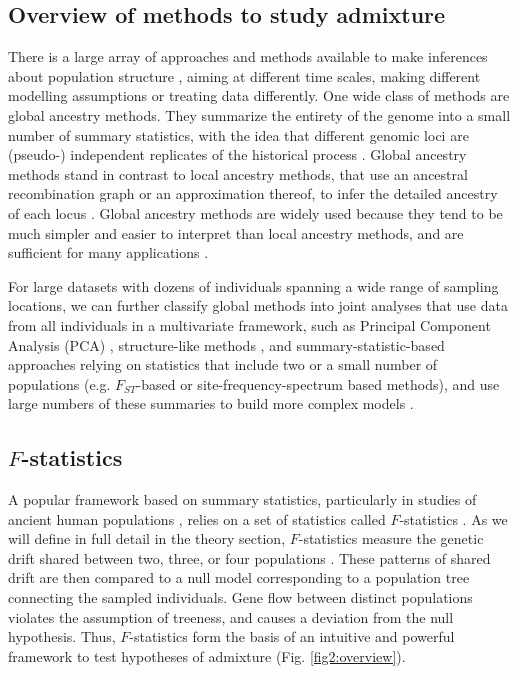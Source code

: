 \documentclass[12pt]{article}
\begin{document}
\subsection{Overview of methods to study admixture}
There is a large array of approaches and methods available to make inferences about population structure \citep[reviewed by][]{schraiber_methods_2015}, aiming at different time scales, making different modelling assumptions or treating data differently. 
One wide class of methods are global ancestry methods. They summarize the entirety of the genome into a small number of summary statistics, with the idea that different genomic loci are (pseudo-) independent replicates of the historical process \citep{pritchard_inference_2000, gopalan_scaling_2016, patterson_ancient_2012,alexander_fast_2009, tang_estimation_2005}. Global ancestry methods stand in contrast to local ancestry methods, that use an ancestral recombination graph or an approximation thereof, to infer the detailed ancestry of each locus  \citep{lawson_inference_2012, hellenthal_genetic_2014, speidel_method_2019, kelleher_inferring_2019}. Global ancestry methods are widely used because they tend to be much simpler and easier to interpret than local ancestry methods, and are sufficient for many applications \citep{pritchard_inference_2000, patterson_population_2006}.

For large datasets with dozens of individuals spanning a wide range of sampling locations, we can further classify global methods into joint analyses that use data from all individuals in a multivariate framework, such as Principal Component Analysis (PCA) \citep{cavalli-sforza_analysis_1975, patterson_population_2006, novembre_genes_2008}, structure-like methods \citep{pritchard_inference_2000, alexander_fast_2009}, and summary-statistic-based approaches relying on statistics that include two or a small number of populations (e.g. $F_{ST}$-based or site-frequency-spectrum based methods), and use large numbers of these summaries to build more complex models \citep{excoffier_fastsimcoal_2011, kamm_efficiently_2020, gutenkunst_inferring_2009}. 

\subsection{$F$-statistics}
A popular framework based on summary statistics, particularly in studies of ancient human populations \citep{orlando_ancient_2021}, relies on a set of statistics called $F$-statistics \citep{patterson_ancient_2012, peter_admixture_2016}. As we will define in full detail in the theory section, $F$-statistics measure the genetic drift shared between two, three, or four populations \citep{patterson_ancient_2012, peter_admixture_2016}. These patterns of shared drift are then compared to a null model corresponding to a population tree connecting the sampled individuals. Gene flow between distinct populations violates the assumption of treeness, and causes a deviation from the null hypothesis. Thus, $F$-statistics form the basis of an intuitive and powerful framework to test hypotheses of admixture (Fig. \ref{fig2:overview}). 
\end{document}
